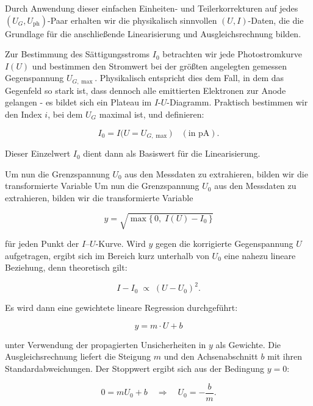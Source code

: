 Durch Anwendung dieser einfachen Einheiten- und Teilerkorrekturen auf jedes $(U_{G},U_{\mathrm{ph}})$-Paar erhalten wir die physikalisch sinnvollen $(U,I)$-Daten, die die Grundlage für die anschließende Linearisierung und Ausgleichsrechnung bilden.

Zur Bestimmung des Sättigungsstroms $I_{0}$ betrachten wir jede Photostromkurve $I(U)$ und bestimmen den Stromwert bei der größten angelegten gemessen Gegenspannung $U_{G,\max}$. Physikalisch entspricht dies dem Fall, in dem das Gegenfeld so stark ist, dass dennoch alle emittierten Elektronen zur Anode gelangen - es bildet sich ein Plateau im $I$-$U$-Diagramm. Praktisch bestimmen wir den Index $i$, bei dem $U_{G}$ maximal ist, und definieren:

\begin{equation}
  I_{0} = I\bigl(U = U_{G,\max}\bigr)\quad(\text{in pA}).
\end{equation}

Dieser Einzelwert $I_{0}$ dient dann als Basiswert für die Linearisierung.

Um nun die Grenzspannung $U_{0}$ aus den Messdaten zu extrahieren, bilden wir die transformierte Variable
Um nun die Grenzspannung $U_{0}$ aus den Messdaten zu extrahieren, bilden wir die transformierte Variable

\begin{equation}
  y = \sqrt{\max\{\,0,\;I(U) - I_{0}\,\}}
\end{equation}

für jeden Punkt der $I$–$U$-Kurve. Wird $y$ gegen die korrigierte Gegenspannung $U$ aufgetragen, ergibt sich im Bereich kurz unterhalb von $U_{0}$ eine nahezu lineare Beziehung, denn theoretisch gilt:

\begin{equation}
  I - I_{0} \;\propto\;(U - U_{0})^{2}.
\end{equation}

Es wird dann eine gewichtete lineare Regression durchgeführt:

\begin{equation}
    y = m \cdot U + b
\end{equation}

unter Verwendung der propagierten Unsicherheiten in $y$ als Gewichte. Die Ausgleichsrechnung liefert die Steigung $m$ und den Achsenabschnitt $b$ mit ihren Standardabweichungen. Der Stoppwert ergibt sich aus der Bedingung $y=0$:

\begin{equation}
  0 = m U_{0} + b
  \quad\Longrightarrow\quad
  U_{0} = -\frac{b}{m}.
\end{equation}

